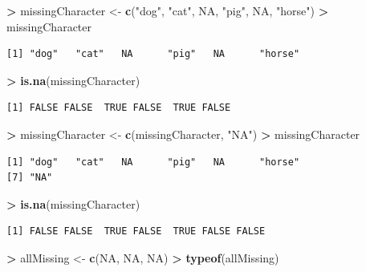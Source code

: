 \documentclass[]{krantz}
\makeatletter
\newenvironment{Shaded}{\begin{snugshade}}{\end{snugshade}}
\newcommand{\KeywordTok}[1]{\textcolor[rgb]{0.27,0.27,0.27}{\textbf{#1}}}
\newcommand{\StringTok}[1]{\textcolor[rgb]{0.5,0.5,0.5}{#1}}
\newcommand{\OtherTok}[1]{\textcolor[rgb]{0.37,0.37,0.37}{#1}}
\newcommand{\OperatorTok}[1]{\textcolor[rgb]{0.43,0.43,0.43}{\textbf{#1}}}
\newcommand{\NormalTok}[1]{#1}
\newenvironment{kframe}{%
\medskip{}
\setlength{\fboxsep}{.8em}
 \def\at@end@of@kframe{}%
 \ifinner\ifhmode%
  \def\at@end@of@kframe{\end{minipage}}%
  \begin{minipage}{\columnwidth}%
 \fi\fi%
 \def\FrameCommand##1{\hskip\@totalleftmargin \hskip-\fboxsep
 \colorbox{shadecolor}{##1}\hskip-\fboxsep
     \hskip-\linewidth \hskip-\@totalleftmargin \hskip\columnwidth}%
 \MakeFramed {\advance\hsize-\width
   \@totalleftmargin\z@ \linewidth\hsize
   \@setminipage}}%
 {\par\unskip\endMakeFramed%
 \at@end@of@kframe}
\renewenvironment{Shaded}{\begin{kframe}}{\end{kframe}}
\theoremstyle{definition}
\theoremstyle{definition}
\theoremstyle{definition}
\theoremstyle{remark}
\makeatother
\begin{document}
\begin{Shaded}
\begin{Highlighting}[]
\OperatorTok{>}\StringTok{ }\NormalTok{missingCharacter <-}\StringTok{ }\KeywordTok{c}\NormalTok{(}\StringTok{"dog"}\NormalTok{, }\StringTok{"cat"}\NormalTok{, }\OtherTok{NA}\NormalTok{, }\StringTok{"pig"}\NormalTok{, }\OtherTok{NA}\NormalTok{, }\StringTok{"horse"}\NormalTok{)}
\OperatorTok{>}\StringTok{ }\NormalTok{missingCharacter}
\end{Highlighting}
\end{Shaded}

\begin{verbatim}
[1] "dog"   "cat"   NA      "pig"   NA      "horse"
\end{verbatim}

\begin{Shaded}
\begin{Highlighting}[]
\OperatorTok{>}\StringTok{ }\KeywordTok{is.na}\NormalTok{(missingCharacter)}
\end{Highlighting}
\end{Shaded}

\begin{verbatim}
[1] FALSE FALSE  TRUE FALSE  TRUE FALSE
\end{verbatim}

\begin{Shaded}
\begin{Highlighting}[]
\OperatorTok{>}\StringTok{ }\NormalTok{missingCharacter <-}\StringTok{ }\KeywordTok{c}\NormalTok{(missingCharacter, }\StringTok{"NA"}\NormalTok{)}
\OperatorTok{>}\StringTok{ }\NormalTok{missingCharacter}
\end{Highlighting}
\end{Shaded}

\begin{verbatim}
[1] "dog"   "cat"   NA      "pig"   NA      "horse"
[7] "NA"   
\end{verbatim}

\begin{Shaded}
\begin{Highlighting}[]
\OperatorTok{>}\StringTok{ }\KeywordTok{is.na}\NormalTok{(missingCharacter)}
\end{Highlighting}
\end{Shaded}

\begin{verbatim}
[1] FALSE FALSE  TRUE FALSE  TRUE FALSE FALSE
\end{verbatim}

\begin{Shaded}
\begin{Highlighting}[]
\OperatorTok{>}\StringTok{ }\NormalTok{allMissing <-}\StringTok{ }\KeywordTok{c}\NormalTok{(}\OtherTok{NA}\NormalTok{, }\OtherTok{NA}\NormalTok{, }\OtherTok{NA}\NormalTok{)}
\OperatorTok{>}\StringTok{ }\KeywordTok{typeof}\NormalTok{(allMissing)}
\end{Highlighting}
\end{Shaded}
\end{document}
